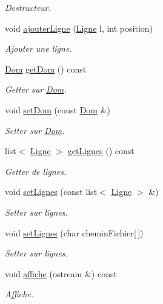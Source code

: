 \begin{DoxyCompactItemize}
\begin{DoxyCompactList}\small\item\em Destructeur. \end{DoxyCompactList}\item 
void \hyperlink{class_buffer_aaa71afa6da49b147a7060900288e67d3}{ajouter\-Ligne} (\hyperlink{class_ligne}{Ligne} l, int position)
\begin{DoxyCompactList}\small\item\em Ajouter une ligne. \end{DoxyCompactList}\item 
\hyperlink{class_dom}{Dom} \hyperlink{class_buffer_ae609f810be14bc51b479583957e8d6c1}{get\-Dom} () const 
\begin{DoxyCompactList}\small\item\em Getter sur \hyperlink{class_dom}{Dom}. \end{DoxyCompactList}\item 
void \hyperlink{class_buffer_a42ebf900f193564fed59440c8ec4286f}{set\-Dom} (const \hyperlink{class_dom}{Dom} \&)
\begin{DoxyCompactList}\small\item\em Setter sur \hyperlink{class_dom}{Dom}. \end{DoxyCompactList}\item 
list$<$ \hyperlink{class_ligne}{Ligne} $>$ \hyperlink{class_buffer_af7f5a6f316e5659e462874998c87921d}{get\-Lignes} () const 
\begin{DoxyCompactList}\small\item\em Getter de lignes. \end{DoxyCompactList}\item 
void \hyperlink{class_buffer_a8d4cb25f19d9782d663d73ca460e1e37}{set\-Lignes} (const list$<$ \hyperlink{class_ligne}{Ligne} $>$ \&)
\begin{DoxyCompactList}\small\item\em Setter sur lignes. \end{DoxyCompactList}\item 
void \hyperlink{class_buffer_a122fe744cef772a83c6228195474171d}{set\-Lignes} (char chemin\-Fichier\mbox{[}$\,$\mbox{]})
\begin{DoxyCompactList}\small\item\em Setter sur lignes. \end{DoxyCompactList}\item 
void \hyperlink{class_buffer_a89c9eac6ff51f0e9b2e8eaddd1c56bd0}{affiche} (ostream \&) const 
\begin{DoxyCompactList}\small\item\em Affiche. \end{DoxyCompactList}\item 

\end{DoxyCompactItemize}
